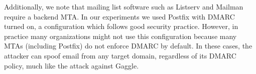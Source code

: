
Additionally, we note that mailing list software such as Listserv and
Mailman require a backend MTA.  In our experiments we used Postfix
with DMARC turned on, a configuration which follows good security
practice.  However, in practice many organizations might not use this
configuration because many MTAs (including Postfix) do not enforce
DMARC by default.  In these cases, the attacker can spoof email from any
target domain, regardless of its DMARC policy, much like the attack
against Gaggle.


